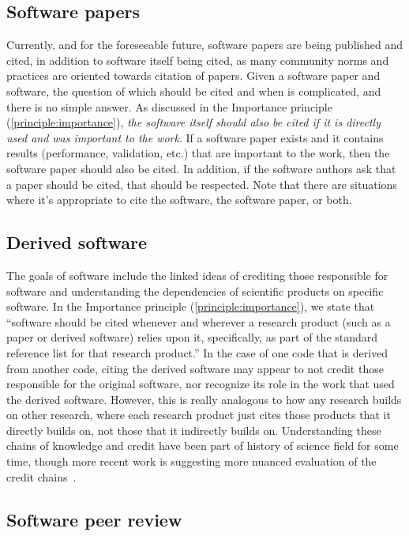 \documentclass[11pt, oneside]{amsart}
\begin{document}
\subsection{Software papers} \label{sec:software_papers}

Currently, and for the foreseeable future, software papers are being published and cited,
in addition to software itself being cited, as many community norms and practices are
oriented towards citation of papers.
Given a software paper and software, the question of which should be cited and when is
complicated, and there is no simple answer.
As discussed in the Importance principle (\ref{principle:importance}), \textit{the software
itself should also be cited if it is directly used and was important to the work}.
If a software paper exists and it contains results (performance, validation, etc.) that are
important to the work, then the software paper should also be cited.
In addition, if the software authors ask that a paper should be cited, that should be respected.
Note that there are situations where it's appropriate to cite the software, the software paper, or both.

\subsection{Derived software}

The goals of software include the linked ideas of crediting those responsible for software and understanding the dependencies of scientific products on specific software.
In the Importance principle (\ref{principle:importance}), we state that
``software should be cited whenever and wherever a research product (such as a paper or derived software) relies upon it, specifically, as part of the standard reference list for that research product.''
In the case of one code that is derived from another code, citing the derived software may appear to not credit those responsible for the original software, nor recognize its role in the work that used the derived software.
However, this is really analogous to how any research builds on other research, where each research product just cites those products that it directly builds on, not those that it indirectly builds on.
Understanding these chains of knowledge and credit have been part of history of science field for some time, though more recent work is suggesting more nuanced evaluation of the credit chains~\cite{casrai-credit, transitive_credit_json-ld}.

\subsection{Software peer review}
\end{document}
